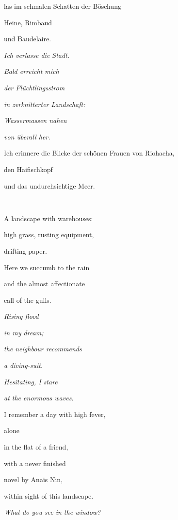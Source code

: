 las im schmalen Schatten der Böschung

Heine, Rimbaud

und Baudelaire.


\bigskip

\emph{
Ich verlasse die Stadt.}

\emph{
Bald erreicht mich }

\emph{
der Flüchtlingsstrom}

\emph{
in zerknitterter Landschaft:}

\emph{
Wassermassen nahen }

\emph{
von überall her.}


\bigskip

Ich erinnere die Blicke der schönen Frauen von Riohacha,

den Haifischkopf

und das undurchsichtige Meer.

~



\bigskip

A landscape with warehouses:

high grass, rusting equipment,

drifting paper.


\bigskip

Here we succumb to the rain 

and the almost affectionate 

call of the gulls.


\bigskip

\emph{
Rising flood}

\emph{
in my dream;}

\emph{
the neighbour recommends}

\emph{
a diving-suit.}

\emph{
Hesitating, I stare}

\emph{
at the enormous waves.}


\bigskip

I remember a day with high fever,

alone

in the flat of a friend,


\bigskip

with a never finished

novel by Anaïs Nin,

within sight of this landscape.


\bigskip

\emph{
What do you see in the window?}

